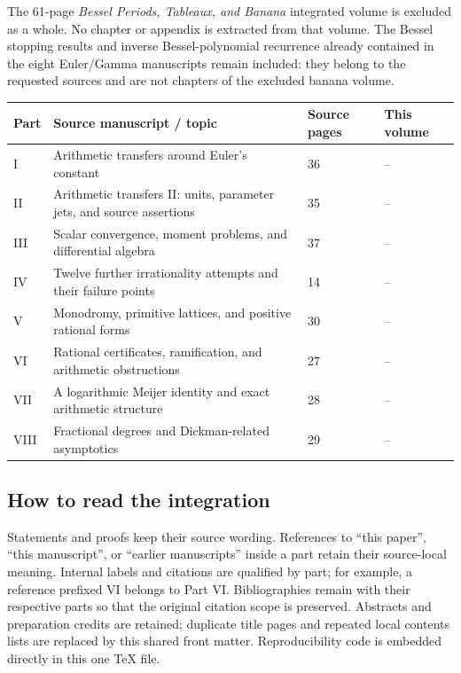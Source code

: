 \documentclass[11pt,a4paper]{article}
\theoremstyle{definition}
\theoremstyle{remark}
\numberwithin{equation}{section}
\begin{document}
The 61-page \emph{Bessel Periods, Tableaux, and Banana} integrated volume is
excluded as a whole. No chapter or appendix is extracted from that volume.
The Bessel stopping results and inverse Bessel-polynomial recurrence already
contained in the eight Euler/Gamma manuscripts remain included: they belong
to the requested sources and are not chapters of the excluded banana volume.

\begin{center}\small
\begin{tabular}{@{}p{}p{}p{}p{}@{}}
\toprule
Part & Source manuscript / topic & Source pages & This volume\\
\midrule
I & Arithmetic transfers around Euler's constant & 36 & \pageref{part1:start}--\pageref{part1:end}\\[5pt]
II & Arithmetic transfers II: units, parameter jets, and source assertions & 35 & \pageref{part2:start}--\pageref{part2:end}\\[5pt]
III & Scalar convergence, moment problems, and differential algebra & 37 & \pageref{part3:start}--\pageref{part3:end}\\[5pt]
IV & Twelve further irrationality attempts and their failure points & 14 & \pageref{part4:start}--\pageref{part4:end}\\[5pt]
V & Monodromy, primitive lattices, and positive rational forms & 30 & \pageref{part5:start}--\pageref{part5:end}\\[5pt]
VI & Rational certificates, ramification, and arithmetic obstructions & 27 & \pageref{part6:start}--\pageref{part6:end}\\[5pt]
VII & A logarithmic Meijer identity and exact arithmetic structure & 28 & \pageref{part7:start}--\pageref{part7:end}\\[5pt]
VIII & Fractional degrees and Dickman-related asymptotics & 29 & \pageref{part8:start}--\pageref{part8:end}\\[5pt]
\bottomrule
\end{tabular}
\end{center}

\subsection*{How to read the integration}
Statements and proofs keep their source wording. References to ``this paper'',
``this manuscript'', or ``earlier manuscripts'' inside a part retain their
source-local meaning. Internal labels and citations are qualified by part;
for example, a reference prefixed VI belongs to Part VI. Bibliographies
remain with their respective parts so that the original citation scope is
preserved. Abstracts and preparation credits are retained; duplicate title
pages and repeated local contents lists are replaced by this shared front
matter. Reproducibility code is embedded directly in this one TeX file.
\end{document}
